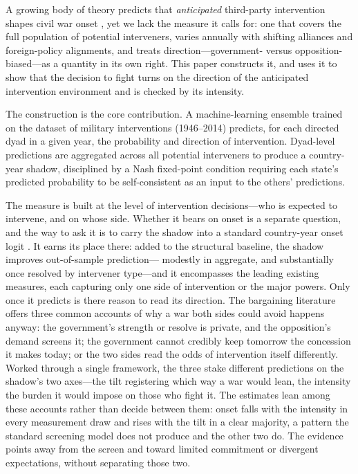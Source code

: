 
A growing body of theory predicts that \textit{anticipated} third-party
intervention shapes civil war onset
\citep{cetinyan2002,cunningham2016,dudley2024,gibilisco2022,kuperman2008,kyddstraus2013,lango2023,sambanis2020},
yet we lack the measure it calls for: one that covers the full population of
potential interveners, varies annually with shifting alliances and
foreign-policy alignments, and treats direction---government- versus
opposition-biased---as a quantity in its own right.  This paper constructs it,
and uses it to show that the decision to fight turns on the direction of the
anticipated intervention environment and is checked by its intensity.

The construction is the core contribution.  A machine-learning ensemble
trained on the \citet{regan2000} dataset of military
interventions (1946--2014) predicts, for each directed dyad in a given
year, the probability and direction of intervention.  Dyad-level
predictions are aggregated across all potential interveners to produce a
country-year shadow, disciplined by a Nash fixed-point condition
requiring each state's predicted probability to be self-consistent as an
input to the others' predictions.

The measure is built at the level of intervention decisions---who is expected
to intervene, and on whose side.  Whether it bears on onset is a separate
question, and the way to ask it is to carry the shadow into a standard
country-year onset logit \citep{fearon2003}.  It earns its place there: added
to the structural baseline, the shadow improves out-of-sample prediction---
modestly in aggregate, and substantially once resolved by intervener type---and
it encompasses the leading existing measures, each capturing only one side of
intervention or the major powers.  Only once it predicts is there reason to
read its direction.  The bargaining literature offers three common accounts of
why a war both sides could avoid happens anyway: the government's strength or
resolve is private, and the opposition's demand screens it; the government
cannot credibly keep tomorrow the concession it makes today; or the two sides
read the odds of intervention itself differently.  Worked through a single
framework, the three stake different predictions on the shadow's two
axes---the tilt registering which way a war would lean, the intensity the
burden it would impose on those who fight it.  The estimates lean among these
accounts rather than decide between them: onset falls with the intensity in
every measurement draw and rises with the tilt in a clear majority, a pattern
the standard screening model does not produce and the other two do.  The
evidence points away from the screen and toward limited commitment or divergent
expectations, without separating those two.

